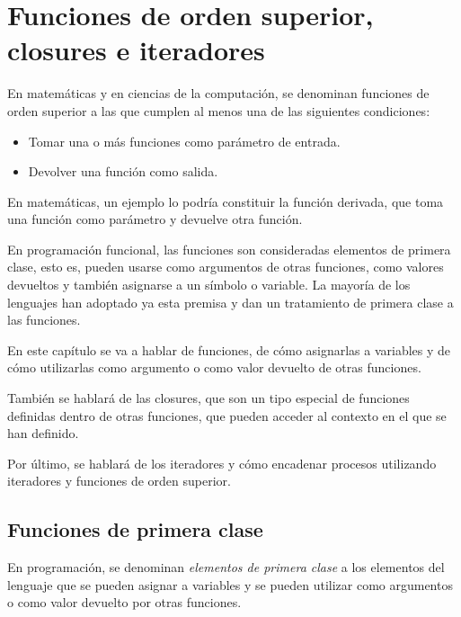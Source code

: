 \chapter{Funciones de orden superior, closures e iteradores}
\label{ch_funciones}

\begin{Resumen}
   En matemáticas y en ciencias de la computación, se denominan funciones de orden superior a las que cumplen al menos una de las siguientes condiciones:
   
   \begin{itemize}
      \item Tomar una o más funciones como parámetro de entrada.
      \item Devolver una función como salida.
   \end{itemize}
   
   En matemáticas, un ejemplo lo podría constituir la función derivada, que toma una función como parámetro y devuelve otra función.
   
   \smallskip
   
   En programación funcional, las funciones son consideradas elementos de primera clase, esto es, pueden usarse como argumentos de otras funciones, como valores devueltos y también asignarse a un símbolo o variable. La mayoría de los lenguajes han adoptado ya esta premisa y dan un tratamiento de primera clase a las funciones.
   
   \smallskip
   
   En este capítulo se va a hablar de funciones, de cómo asignarlas a variables y de cómo  utilizarlas como argumento o como valor devuelto de otras funciones.
   
   \smallskip
   
   También se hablará de las closures, que son un tipo especial de funciones definidas dentro de otras funciones, que pueden acceder al contexto en el que se han definido. 
   
   \smallskip
   
   Por último, se hablará de los iteradores y cómo encadenar procesos utilizando iteradores y funciones de orden superior.
   
\end{Resumen}

\section{Funciones de primera clase}
\noindent En programación, se denominan \textit{elementos de primera clase} a los elementos del lenguaje que se pueden asignar a variables y se pueden utilizar como argumentos o como valor devuelto por otras funciones.


